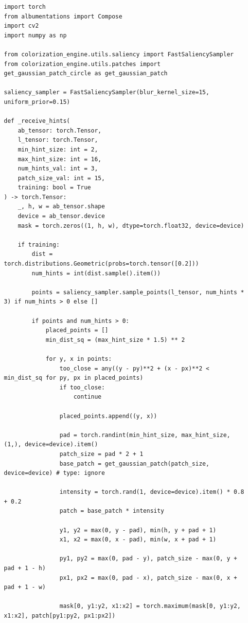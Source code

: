 \begin{lstlisting}[caption={Функція генерації Гауссівських підказок}]
import torch
from albumentations import Compose
import cv2
import numpy as np

from colorization_engine.utils.saliency import FastSaliencySampler
from colorization_engine.utils.patches import get_gaussian_patch_circle as get_gaussian_patch

saliency_sampler = FastSaliencySampler(blur_kernel_size=15, uniform_prior=0.15)

def _receive_hints(
    ab_tensor: torch.Tensor,
    l_tensor: torch.Tensor,
    min_hint_size: int = 2,
    max_hint_size: int = 16,
    num_hints_val: int = 3,
    patch_size_val: int = 15,
    training: bool = True
) -> torch.Tensor:
    _, h, w = ab_tensor.shape
    device = ab_tensor.device
    mask = torch.zeros((1, h, w), dtype=torch.float32, device=device)

    if training:
        dist = torch.distributions.Geometric(probs=torch.tensor([0.2]))
        num_hints = int(dist.sample().item())

        points = saliency_sampler.sample_points(l_tensor, num_hints * 3) if num_hints > 0 else []

        if points and num_hints > 0:
            placed_points = []
            min_dist_sq = (max_hint_size * 1.5) ** 2 

            for y, x in points:
                too_close = any((y - py)**2 + (x - px)**2 < min_dist_sq for py, px in placed_points)
                if too_close:
                    continue

                placed_points.append((y, x))

                pad = torch.randint(min_hint_size, max_hint_size, (1,), device=device).item()
                patch_size = pad * 2 + 1
                base_patch = get_gaussian_patch(patch_size, device=device) # type: ignore

                intensity = torch.rand(1, device=device).item() * 0.8 + 0.2
                patch = base_patch * intensity

                y1, y2 = max(0, y - pad), min(h, y + pad + 1)
                x1, x2 = max(0, x - pad), min(w, x + pad + 1)

                py1, py2 = max(0, pad - y), patch_size - max(0, y + pad + 1 - h)
                px1, px2 = max(0, pad - x), patch_size - max(0, x + pad + 1 - w)

                mask[0, y1:y2, x1:x2] = torch.maximum(mask[0, y1:y2, x1:x2], patch[py1:py2, px1:px2])


\end{lstlisting}
